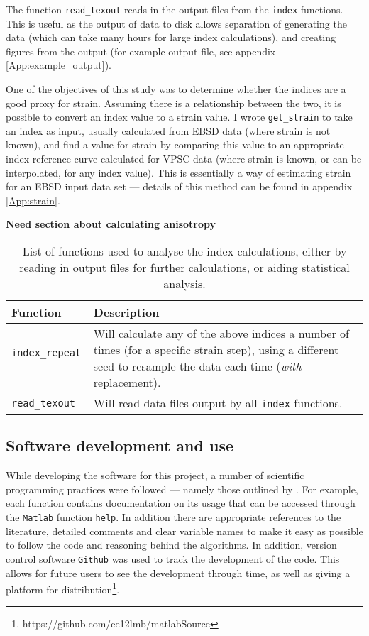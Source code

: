 \documentclass[a4paper,12pt,twoside]{report}
\numberwithin{equation}{chapter}
\begin{document}
The function \texttt{read\_{}texout} reads in the output files from the \texttt{index} functions. This is useful as the output of data to disk allows separation of generating the data (which can take many hours for large index calculations), and creating figures from the output (for example output file, see appendix \ref{App:example_output}).

One of the objectives of this study was to determine whether the indices are a good proxy for strain. Assuming there is a relationship between the two, it is possible to convert an index value to a strain value. I wrote \texttt{get\_{}strain} to take an index as input, usually calculated from EBSD data (where strain is not known), and find a value for strain by comparing this value to an appropriate index reference curve calculated for VPSC data (where strain is known, or can be interpolated, for any index value). This is essentially a way of estimating strain for an EBSD input data set --- details of this method can be found in appendix \ref{App:strain}.

\textbf{Need section about calculating anisotropy}

\begin{table}[h!] 
	\centering
	\caption[Functions: analysis]{List of functions used to analyse the index calculations, either by reading in output files for further calculations, or aiding statistical analysis.}
	\noindent
	
\begin{tabularx}{\textwidth}{lX}

\hline
\hline
Function    & Description   \\ 
\hline
\hline
\texttt{index\_{}repeat}$^{\dagger}$ & Will calculate any of the above indices a number of times (for a specific strain step), using a different seed to resample the data each time (\emph{with} replacement). \\

\texttt{read\_{}texout} & Will read data files output by all \texttt{index} functions. \\
\hline

\end{tabularx}
\label{tab:analysis_functions}
\end{table}

\subsection{Software development and use}

While developing the software for this project, a number of scientific programming practices were followed --- namely those outlined by \cite{Wilson2014}. For example, each function contains documentation on its usage that can be accessed through the \texttt{Matlab} function \texttt{help}. In addition there are appropriate references to the literature, detailed comments and clear variable names to make it easy as possible to follow the code and reasoning behind the algorithms. In addition, version control software \texttt{Github} was used to track the development of the code. This allows for future users to see the development through time, as well as giving a platform for distribution\footnote{https://github.com/ee12lmb/matlabSource}.
\end{document}
